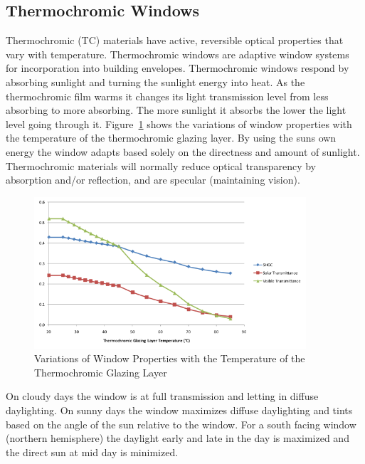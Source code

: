 \subsection{Thermochromic Windows}\label{thermochromic-windows}

Thermochromic (TC) materials have active, reversible optical properties that vary with temperature. Thermochromic windows are adaptive window systems for incorporation into building envelopes. Thermochromic windows respond by absorbing sunlight and turning the sunlight energy into heat. As the thermochromic film warms it changes its light transmission level from less absorbing to more absorbing. The more sunlight it absorbs the lower the light level going through it. Figure~\ref{fig:variations-of-window-properties-with} shows the variations of window properties with the temperature of the thermochromic glazing layer. By using the suns own energy the window adapts based solely on the directness and amount of sunlight. Thermochromic materials will normally reduce optical transparency by absorption and/or reflection, and are specular (maintaining vision).

\begin{figure}[hbtp] %
\centering
\includegraphics[width=0.9\textwidth, height=0.9\textheight, keepaspectratio=true]{media/image1015.svg.png}
\caption{Variations of Window Properties with the Temperature of the Thermochromic Glazing Layer \protect \label{fig:variations-of-window-properties-with}}
\end{figure}

On cloudy days the window is at full transmission and letting in diffuse daylighting. On sunny days the window maximizes diffuse daylighting and tints based on the angle of the sun relative to the window. For a south facing window (northern hemisphere) the daylight early and late in the day is maximized and the direct sun at mid day is minimized.

